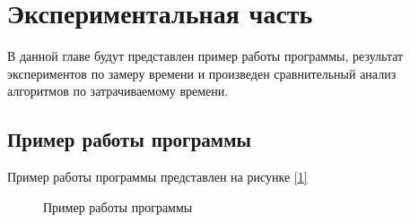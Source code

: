 \documentclass{article}
\begin{document}
	\newpage
	\section{Экспериментальная часть}
	В данной главе будут представлен пример работы программы, результат экспериментов по замеру времени и произведен сравнительный анализ алгоритмов по затрачиваемому времени.
	\subsection{Пример работы программы}
	Пример работы программы представлен на рисунке \hyperref[programmWork]{[\ref{programmWork}]}
	 	\begin{figure}[h!]
		 	\caption{Пример работы программы}
		 	\label{programmWork}
	 	\end{figure}
	
\end{document}
